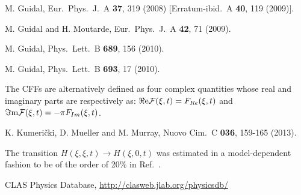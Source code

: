 \documentclass[nofootinbib,twocolumn,showpacs,prl,superscriptaddress,secnumarabic,amssymb,nobibnotes,aps,floatfix]{revtex4-1}
\begin{document}
\begin{thebibliography}{99}
M. Guidal,
Eur.\ Phys.\ J.\ A {\bf 37}, 319 (2008)
[Erratum-ibid.\ A {\bf 40}, 119 (2009)].

M. Guidal and H. Moutarde,
Eur.\ Phys.\ J.\ A {\bf 42}, 71 (2009).

M. Guidal,
Phys.\ Lett.\ B {\bf 689}, 156 (2010).

M. Guidal,
Phys.\ Lett.\ B {\bf 693}, 17 (2010).

The CFFs are alternatively defined as four complex quantities whose real and imaginary
parts are respectively as: 
$\Re{\rm e}{\cal F}(\xi,t) = F_{Re}(\xi,t)$ and 
$\Im{\rm m}{\cal F}(\xi,t) = -\pi F_{Im}(\xi,t)$.

K. Kumeri\v{c}ki, D. Mueller and M. Murray,
Nuovo Cim.\ C {\bf 036}, 159-165 (2013).

The transition $H(\xi,\xi,t)\to H(\xi,0,t)$ was estimated in a model-dependent
fashion to be of the order of 20\% in Ref.~\cite{Guidal:2013rya}.

CLAS Physics Database,
\url{http://clasweb.jlab.org/physicsdb/}

\end{thebibliography}
\end{document}
